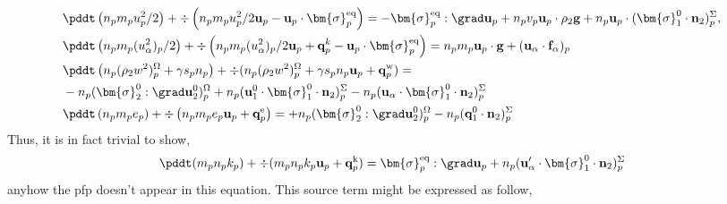 \begin{align*}
    &\pddt \left(n_p m_p u_p^2/ 2\right)
    + \div \left(n_p
    m_p u_p^2/ 2 \textbf{u}_p 
    - \textbf{u}_p \cdot \bm{\sigma}_p^\text{eq}
    \right)
    = 
    - \bm{\sigma}_p^\text{eq}  :\grad \textbf{u}_p
    +  n_p v_p \textbf{u}_p \cdot 
    \rho_2 \textbf{g}
    + n_p \textbf{u}_p \cdot (\bm{\sigma}_1^0 \cdot \textbf{n}_2)^\Sigma_p,\\
    &\pddt \left(n_p m_p (u_\alpha^2)_p/ 2\right)
    + \div \left(n_p
    m_p (u_\alpha^2)_p/ 2 \textbf{u}_p 
    + \textbf{q}^k_p
    - \textbf{u}_p \cdot \bm{\sigma}_p^\text{eq}
    \right)
    = 
    n_p m_p \textbf{u}_p \cdot
    \textbf{g}
    + 
    (\textbf{u}_\alpha\cdot
    \textbf{f}_\alpha)_p\\
    &\pddt \left(n_p (\rho_2 w^2 )_p^\Omega+\gamma s_p n_p\right)
    + \div 
    (n_p (\rho_2 w^2 )_p^\Omega+\gamma s_p n_p
    \textbf{u}_p 
    +  \textbf{q}_p^\text{w}
    )
    = \\
    &- n_p (\bm{\sigma}_2^0 : \grad\textbf{u}_2^0)^\Omega_p
    + n_p (\textbf{u}_1^0 \cdot \bm{\sigma}_1^0 \cdot  \textbf{n}_2)^\Sigma_p
    - n_p (\textbf{u}_\alpha \cdot \bm{\sigma}_1^0 \cdot  \textbf{n}_2)^\Sigma_p
    \\
    &\pddt \left(n_p m_p e_p\right)
    + \div \left(n_p
    m_p e_p \textbf{u}_p 
    +  \textbf{q}_p^\text{e}
    \right)
    = 
    + n_p (\bm{\sigma}_2^0 : \grad\textbf{u}_2^0)^\Omega_p
    - n_p (\textbf{q}_1^0\cdot \textbf{n}_2)^\Sigma_p\\
\end{align*}
Thus, it is in fact trivial to show, 
\begin{multline*}
    \pddt(m_p n_pk_p)
    + \div(m_pn_p k_p \textbf{u}_p 
    + \textbf{q}_p^\text{k})
    = 
     \bm{\sigma}_p^\text{eq}  :\grad \textbf{u}_p
     + n_p (\textbf{u}_\alpha' \cdot \bm{\sigma}_1^0 \cdot  \textbf{n}_2)^\Sigma_p
    \\
\end{multline*}
anyhow the pfp doesn't appear in this equation. 
This source term might be expressed as follow, 


